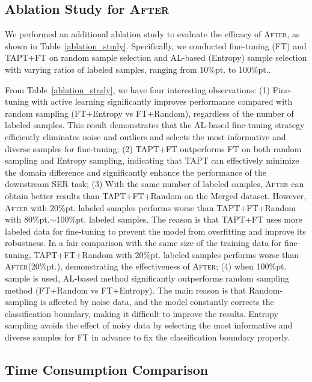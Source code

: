 \documentclass{article}
\begin{document}
\subsection{Ablation Study for \textsc{After}}

We performed an additional ablation study to evaluate the efficacy of \textsc{After}, as shown in Table~\ref{ablation_study}. Specifically, we conducted fine-tuning (FT) and TAPT+FT on random sample selection and AL-based (Entropy) sample selection with varying ratios of labeled samples, ranging from 10\%pt. to 100\%pt..




From Table~\ref{ablation_study}, we have four interesting observations: (1) Fine-tuning with active learning significantly improves performance compared with random sampling (FT+Entropy vs FT+Random), regardless of the number of labeled samples. This result demonstrates that the AL-based fine-tuning strategy efficiently eliminates noise and outliers and selects the most informative and diverse samples for fine-tuning; (2) TAPT+FT outperforms FT on both random sampling and Entropy sampling, indicating that TAPT can effectively minimize the domain difference and significantly enhance the performance of the downstream SER task; (3) With the same number of labeled samples, \textsc{After} can obtain better results than TAPT+FT+Random on the Merged dataset. However, \textsc{After} with 20\%pt. labeled samples performs worse than TAPT+FT+Random with 80\%pt.$\sim$100\%pt. labeled samples. The reason is that TAPT+FT uses more labeled data for fine-tuning to prevent the model from overfitting and improve its robustness. In a fair comparison with the same size of the training data for fine-tuning, TAPT+FT+Random with 20\%pt. labeled samples performs worse than \textsc{After}(20\%pt.), demonstrating the effectiveness of \textsc{After}; (4) when 100\%pt. sample is used, AL-based method significantly outperforms random sampling method (FT+Random vs FT+Entropy). The main reason is that Random-sampling is affected by noise data, and the model constantly corrects the classification boundary, making it difficult to improve the results. Entropy sampling avoids the effect of noisy data by selecting the most informative and diverse samples for FT in advance to fix the classification boundary properly.


\subsection{Time Consumption Comparison}
\label{running_time}
\end{document}
